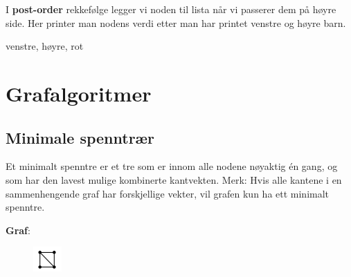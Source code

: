 \documentclass[12pt]{report}
\begin{document}

I \textbf{post-order} rekkefølge legger vi noden til lista når vi passerer dem på høyre side. Her printer man nodens verdi etter man har printet venstre og høyre barn.\par

 venstre, høyre, rot\par

\par 
\setlength{\parskip}{15.0pt}
\section*{Grafalgoritmer}

\vspace{\baselineskip}
\setlength{\parskip}{6.0pt}
\subsection*{Minimale spenntrær}
\setlength{\parskip}{10.56pt}
Et minimalt spenntre er et tre som er innom alle nodene nøyaktig én gang, og som har den lavest mulige kombinerte kantvekten. Merk: Hvis alle kantene i en sammenhengende graf har forskjellige vekter, vil grafen kun ha ett minimalt spenntre.\par

\textbf{Graf}:\par




\begin{figure}[H]
	\begin{Center}
		\includegraphics[width=0.43in,height=0.37in]{./media/image108.png}
	\end{Center}
\end{figure}
\end{document}
